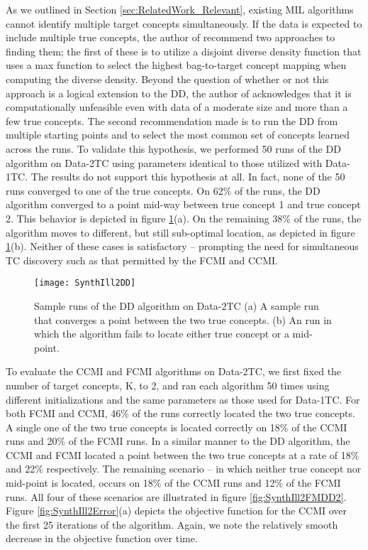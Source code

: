 \documentclass[12pt,dvips]{report}
\numberwithin{equation}{section}
\begin{document}
As we outlined in Section \ref{sec:RelatedWork_Relevant}, existing MIL algorithms cannot identify multiple target concepts simultaneously.  If the data is expected to include multiple true concepts, the author of \cite{maronT} recommend two approaches to finding them;  the first of these is to utilize a disjoint diverse density function that uses a max function to select the highest bag-to-target concept mapping when computing the diverse density.  Beyond the question of whether or not this approach is a logical extension to the DD, the author of \cite{maronT} acknowledges that it is computationally unfeasible even with data of a moderate size and more than a few true concepts.  The second recommendation made is to run the DD from multiple starting points and to select the most common set of concepts learned across the runs.  To validate this hypothesis, we performed 50 runs of the DD algorithm on Data-2TC using parameters identical to those utilized with Data-1TC.  The results do not support this hypothesis at all.  In fact, none of the 50 runs converged to one of the true concepts.  On 62\% of the runs, the DD algorithm converged to a point mid-way between true concept 1 and true concept 2.  This behavior is depicted in figure \ref{fig:SynthIll2DD}(a).  On the remaining 38\% of the runs, the algorithm moves to different, but still sub-optimal location, as depicted in figure \ref{fig:SynthIll2DD}(b).  Neither of these cases is satisfactory -- prompting the need for simultaneous TC discovery such as that permitted by the FCMI and CCMI.

\begin{figure}[htb]
 \texttt{[image: SynthIll2DD]}
 
\caption{Sample runs of the DD algorithm on Data-2TC (a) A sample run that converges a point between the two true concepts. (b) An run in which the algorithm fails to locate either true concept or a mid-point.}
\label{fig:SynthIll2DD}
\end{figure}

To evaluate the CCMI and FCMI algorithms on Data-2TC, we first fixed the number of target concepts, K, to 2, and ran each algorithm 50 times using different initializations and the same parameters as those used for Data-1TC.  For both FCMI and CCMI, 46\% of the runs correctly located the two true concepts.  A single one of the two true concepts is located correctly on 18\% of the CCMI runs and 20\% of the FCMI runs.  In a similar manner to the DD algorithm, the CCMI and FCMI located a point between the two true concepts at a rate of 18\% and 22\% respectively.  The remaining scenario -- in which neither true concept nor mid-point is located, occurs on 18\% of the CCMI runs and 12\% of the FCMI runs.  All four of these scenarios are illustrated in figure \ref{fig:SynthIll2FMDD2}.  Figure \ref{fig:SynthIll2Error}(a) depicts the objective function for the CCMI over the first 25 iterations of the algorithm.  Again, we note the relatively smooth decrease in the objective function over time.
\end{document}
